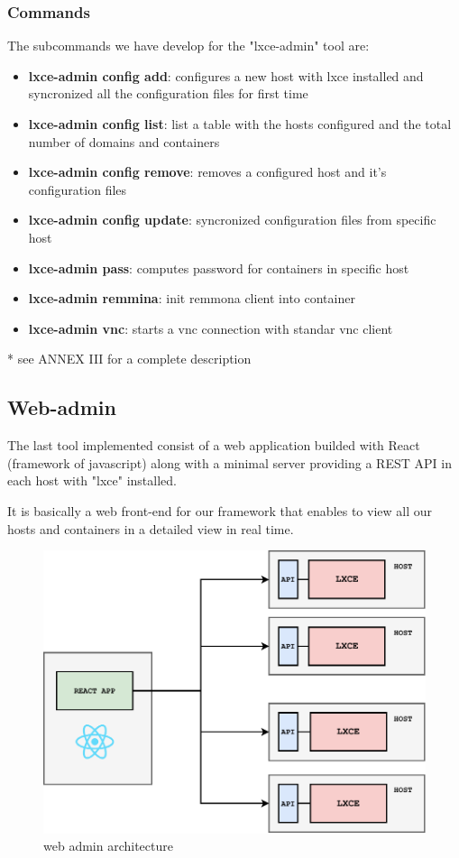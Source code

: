 \subsubsection{Commands}
The subcommands we have develop for the "lxce-admin" tool are:
\begin{itemize}
	\item{\textbf{lxce-admin config add}: configures a new host with lxce installed and syncronized all the configuration files for first time}
	\item{\textbf{lxce-admin config list}: list a table with the hosts configured and the total number of domains and containers}
	\item{\textbf{lxce-admin config remove}: removes a configured host and it's configuration files}
	\item{\textbf{lxce-admin config update}: syncronized configuration files from specific host}
	\item{\textbf{lxce-admin pass}: computes password for containers in specific host}
	\item{\textbf{lxce-admin remmina}: init remmona client into container}
	\item{\textbf{lxce-admin vnc}: starts a vnc connection with standar vnc client}
\end{itemize}
* see ANNEX III for a complete description

\newpage
\subsection{Web-admin}
The last tool implemented consist of a web application builded with React (framework of javascript) along with a minimal server providing a REST API in each host with "lxce" installed.

It is basically a web front-end for our framework that enables to view all our hosts and containers in a detailed view in real time.

\begin{figure}[H]
	\label{fig:Web admin architecture}
	\centering
	\includegraphics{img/03/web-admin-diagram.pdf}
	\caption[Web admin block diagram]{\footnotesize{web admin architecture}}
\end{figure}

